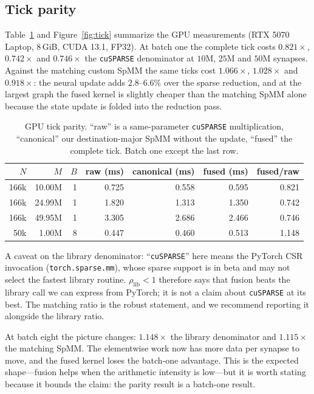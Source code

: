 \documentclass[11pt]{article}
\begin{document}
\subsection{Tick parity}

Table~\ref{tab:gpu-core} and Figure~\ref{fig:tick} summarize the GPU
measurements (RTX 5070 Laptop, 8\,GiB, CUDA 13.1, FP32). At batch one the
complete tick costs $0.821\times$, $0.742\times$ and $0.746\times$ the
\texttt{cuSPARSE} denominator at $10$M, $25$M and $50$M synapses. Against the
matching custom SpMM the same ticks cost $1.066\times$, $1.028\times$ and
$0.918\times$: the neural update adds $2.8$--$6.6\%$ over the sparse reduction,
and at the largest graph the fused kernel is slightly cheaper than the matching
SpMM alone because the state update is folded into the reduction pass.

\begin{table}[t]
\centering
\small
\caption{GPU tick parity. ``raw'' is a same-parameter \texttt{cuSPARSE}
multiplication, ``canonical'' our destination-major SpMM without the update,
``fused'' the complete tick. Batch one except the last row.}
\label{tab:gpu-core}
\begin{tabular}{rrrrrrr}
\toprule
$N$ & $M$ & $B$ & raw (ms) & canonical (ms) & fused (ms) & fused/raw \\
\midrule
166k & 10.00M & 1 & 0.725 & 0.558 & 0.595 & 0.821 \\
166k & 24.99M & 1 & 1.820 & 1.313 & 1.350 & 0.742 \\
166k & 49.95M & 1 & 3.305 & 2.686 & 2.466 & 0.746 \\
50k  & 1.00M  & 8 & 0.447 & 0.460 & 0.513 & 1.148 \\
\bottomrule
\end{tabular}
\end{table}

A caveat on the library denominator: ``\texttt{cuSPARSE}'' here means the
PyTorch CSR invocation (\texttt{torch.sparse.mm}), whose sparse support is in
beta and may not select the fastest library routine. $\rho_{\text{lib}} < 1$
therefore says that fusion beats the library call we can express from PyTorch;
it is not a claim about \texttt{cuSPARSE} at its best. The matching ratio is the
robust statement, and we recommend reporting it alongside the library ratio.

At batch eight the picture changes: $1.148\times$ the library denominator and
$1.115\times$ the matching SpMM. The elementwise work now has more data per
synapse to move, and the fused kernel loses the batch-one advantage. This is the
expected shape---fusion helps when the arithmetic intensity is low---but it is
worth stating because it bounds the claim: the parity result is a batch-one
result.
\end{document}
